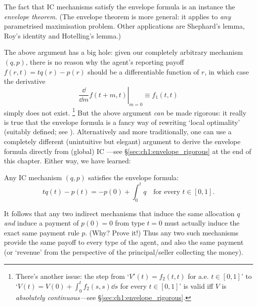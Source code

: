 The fact that IC mechanisms satisfy the envelope formula is an instance the \emph{envelope theorem.}
(The envelope theorem is more general: it applies to \emph{any} parametrised maximisation problem. Other applications are Shephard's lemma, Roy's identity and Hotelling's lemma.)


The above argument has a big hole: given our completely arbitrary mechanism $(q,p)$, there is no reason why the agent's reporting payoff $f(r,t) = t q(r) - p(r)$ should be a differentiable function of $r$, in which case the derivative
%
\begin{equation*}
	\left. \frac{\dd}{\dd m} f( t+m, t ) \right|_{m=0}
	\equiv f_1(t,t)
\end{equation*}
%
simply does not exist.%
	\footnote{There's another issue:
	the step from `$V'(t) = f_2(t,t)$ for a.e. $t \in [0,1]$' to `$V(t) = V(0) + \int_0^t f_2(s,s) \dd s$ for every $t \in [0,1]$'
	is valid iff $V$ is \emph{absolutely continuous---}see §\ref{sec:ch1:envelope_rigorous}.}
But the above argument \emph{can} be made rigorous: it really is true that the envelope formula is a fancy way of rewriting `local optimality' (suitably defined; see \textcite{Sinander2022}).
Alternatively and more traditionally,
one can use a completely different (unintuitive but elegant) argument to derive the envelope formula directly from (global) IC \parencite{MilgromSegal2002}---see §\ref{sec:ch1:envelope_rigorous} at the end of this chapter.
Either way, we have learned:

\begin{namedthm}
	\label{proposition:ic_env}
	Any IC mechanism $(q,p)$ satisfies the envelope formula:
	\begin{equation*}
		t q(t) - p(t) = - p(0) + \int_0^t q
		\quad \text{for every $t \in [0,1]$.}
	\end{equation*}
\end{namedthm}


\begin{remark}
	\label{remark:rev_equivalence}
	It follows that any two indirect mechanisms
	that induce the same allocation $q$
	\emph{and} induce a payment of $p(0)=0$ from type $t=0$
	must actually induce the exact same payment rule $p$.
	(Why? Prove it!)
	Thus any two such mechanisms provide the same payoff to every type of the agent,
	and also the same payment (or `revenue' from the perspective of the principal/seller collecting the money).
\end{remark}


